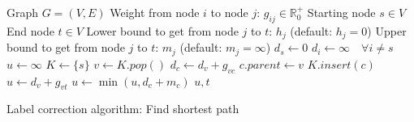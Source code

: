 \documentclass{article}
\begin{document}
\begin{preview}
    \begin{algorithm}[H]
        \begin{algorithmic}
        \Require
        \Statex Graph $G = (V, E)$
        \Statex Weight from node $i$ to node $j$: $g_{ij} \in \mathbb{R}_0^+$
        \Statex Starting node $s \in V$
        \Statex End node $t \in V$
        \Statex Lower bound to get from node $j$ to $t$: $h_j$ (default: $h_j = 0$)
        \Statex Upper bound to get from node $j$ to $t$: $m_j$ (default: $m_j = \infty$)
            \State $d_s \gets 0$
            \State $d_i \gets \infty \quad \forall i \neq s$ 
            \State $u \gets \infty$ 
            \State $K \gets \{s\}$ 
                \State $v \gets K.pop()$
                        \State $d_c \gets d_v + g_{vc}$
                        \State $c.parent \gets v$
                            \State $K.insert(c)$
                        \EndIf
                            \State $u \gets d_v + g_{vt}$
                        \EndIf
                    \EndIf
                    \State $u \gets \min (u, d_c + m_c)$
                \EndFor
            \EndWhile
            \Return $u, t$
        \EndProcedure
        \end{algorithmic}
    \caption{Label correction algorithm: Find shortest path}
    \label{alg:label-correction-algorithm}
    \end{algorithm}
\end{preview}
\end{document}
